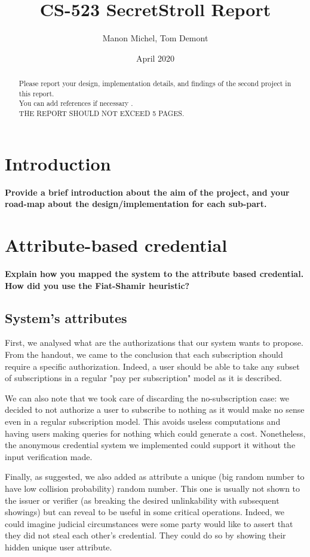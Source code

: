 \documentclass[10pt,conference,compsocconf]{IEEEtran}
\title{CS-523 SecretStroll Report}
\author{Manon Michel, Tom Demont}
\date{April 2020}
\begin{document}
\maketitle

\begin{abstract}
    Please report your design, implementation details, and findings of the second project in this report. \\
    You can add references if necessary \cite{article}. \\
    THE REPORT SHOULD NOT EXCEED 5 PAGES.
\end{abstract}

\section{Introduction}

\textbf{Provide a brief introduction about the aim of the project, and your road-map about the design/implementation for each sub-part.}

\section{Attribute-based credential}
\textbf{Explain how you mapped the system to the attribute based credential. How did you
use the Fiat-Shamir heuristic?}
\subsection{System's attributes}
First, we analysed what are the authorizations that our system wants to propose. From the handout, we came to the conclusion that each subscription should require a specific authorization. Indeed, a user should be able to take any subset of subscriptions in a regular "pay per subscription" model as it is described.

We can also note that we took care of discarding the no-subscription case: we decided to not authorize a user to subscribe to nothing as it would make no sense even in a regular subscription model. This avoids useless computations and having users making queries for nothing which could generate a cost. Nonetheless, the anonymous credential system we implemented could support it without the input verification made.

Finally, as suggested, we also added as attribute a unique (big random number to have low collision probability) random number. This one is usually not shown to the issuer or verifier (as breaking the desired unlinkability with subsequent showings) but can reveal to be useful in some critical operations. Indeed, we could imagine judicial circumstances were some party would like to assert that they did not steal each other's credential. They could do so by showing their hidden unique user attribute.
\end{document}

